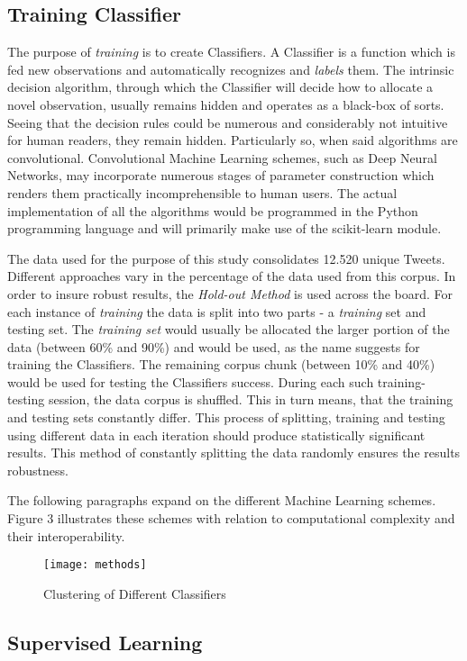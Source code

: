 	\subsection{Training Classifier}
	The purpose of \textit{training} is to create Classifiers. A Classifier is a function which is fed  new observations and automatically recognizes and \textit{labels} them. The intrinsic decision algorithm, through which the Classifier will decide how to allocate a novel observation, usually remains hidden and operates as a black-box of sorts. Seeing that the decision rules could be numerous and considerably not intuitive for human readers, they remain hidden. Particularly so, when said algorithms are convolutional. Convolutional Machine Learning schemes, such as Deep Neural Networks, may incorporate numerous stages of parameter construction which renders them practically incomprehensible to human users. The actual implementation of all the algorithms would be programmed in the Python programming language and will primarily make use of the scikit-learn\cite{scikit-learn} module.
	\par
	The data used for the purpose of this study consolidates 12.520 unique Tweets. Different approaches vary in the percentage of the data used from this corpus. In order to insure robust results, the \textit{Hold-out Method} is used across the board. For each instance of \textit{training} the data is split into two parts - a \textit{training} set and testing set. The \textit{training set} would usually be allocated the larger portion of the data (between 60\% and 90\%) and would be used, as the name suggests for training the Classifiers. The remaining corpus chunk (between 10\% and 40\%) would be used for testing the Classifiers success. During each such training-testing session, the data corpus is shuffled. This in turn means, that the training and testing sets constantly differ. This process of splitting, training and testing using different data in each iteration should produce statistically significant results. This method of constantly splitting the data randomly ensures the results robustness.
	\par
	The following paragraphs expand on the different Machine Learning schemes. Figure 3 illustrates these schemes with relation to computational complexity and their interoperability.
	
	\begin{figure}[h]
		\centering
		\texttt{[image: methods]}
		\captionsetup{width=0.8\textwidth}
		\caption{Clustering of Different Classifiers}
	\end{figure}
	
	\subsection{Supervised Learning}
	\label{classifer_types}
	
	
	
	
	
	

	
	
	
	
	
	
	
	
	
	
	
	
		
	